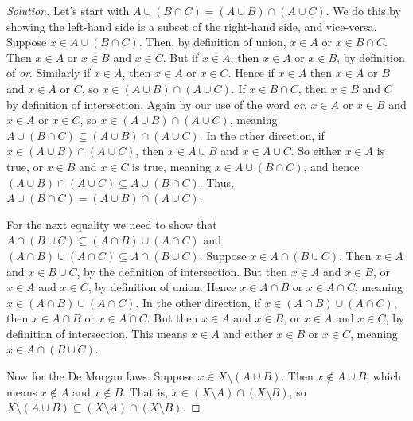 \documentclass{article}
\theoremstyle{normal}
\begin{document}
    \begin{proof}[Solution]
        Let's start with $A\cup(B\cap{C})=(A\cup{B})\cap(A\cup{C})$. We do this
        by showing the left-hand side is a subset of the right-hand side, and
        vice-versa. Suppose $x\in{A}\cup(B\cap{C})$. Then, by definition of
        union, $x\in{A}$ or $x\in{B}\cap{C}$. Then $x\in{A}$ or $x\in{B}$ and
        $x\in{C}$. But if $x\in{A}$, then $x\in{A}$ or $x\in{B}$, by definition
        of \textit{or}. Similarly if $x\in{A}$, then $x\in{A}$ or $x\in{C}$.
        Hence if $x\in{A}$ then $x\in{A}$ or $B$ and $x\in{A}$ or $C$, so
        $x\in(A\cup{B})\cap(A\cup{C})$. If $x\in{B}\cap{C}$, then $x\in{B}$ and
        $C$ by definition of intersection. Again by our use of the word
        \textit{or}, $x\in{A}$ or $x\in{B}$ and $x\in{A}$ or $x\in{C}$, so
        $x\in(A\cup{B})\cap(A\cup{C})$, meaning
        $A\cup(B\cap{C})\subseteq(A\cup{B})\cap(A\cup{C})$. In the other
        direction, if $x\in(A\cup{B})\cap(A\cup{C})$, then
        $x\in{A}\cup{B}$ and $x\in{A}\cup{C}$. So either $x\in{A}$ is true,
        or $x\in{B}$ and $x\in{C}$ is true, meaning
        $x\in{A}\cup(B\cap{C})$, and hence
        $(A\cup{B})\cap(A\cup{C})\subseteq{A}\cup(B\cap{C})$. Thus,
        $A\cup(B\cap{C})=(A\cup{B})\cap(A\cup{C})$.
        \par\hfill\par
        For the next equality we need to show that
        $A\cap(B\cup{C})\subseteq(A\cap{B})\cup(A\cap{C})$ and
        $(A\cap{B})\cup(A\cap{C})\subseteq{A}\cap(B\cup{C})$.
        Suppose $x\in{A}\cap(B\cup{C})$. Then $x\in{A}$ and
        $x\in{B}\cup{C}$, by the definition of intersection. But then
        $x\in{A}$ and $x\in{B}$, or $x\in{A}$ and $x\in{C}$, by definition of
        union. Hence $x\in{A}\cap{B}$ or $x\in{A}\cap{C}$, meaning
        $x\in(A\cap{B})\cup(A\cap{C})$. In the other direction, if
        $x\in(A\cap{B})\cup(A\cap{C})$, then $x\in{A}\cap{B}$ or
        $x\in{A}\cap{C}$. But then $x\in{A}$ and $x\in{B}$, or
        $x\in{A}$ and $x\in{C}$, by definition of intersection. This means
        $x\in{A}$ and either $x\in{B}$ or $x\in{C}$, meaning
        $x\in{A}\cap(B\cup{C})$.
        \par\hfill\par
        Now for the De Morgan laws. Suppose $x\in{X}\setminus(A\cup{B})$.
        Then $x\notin{A}\cup{B}$, which means $x\notin{A}$ and
        $x\notin{B}$. That is, $x\in(X\setminus{A})\cap(X\setminus{B})$,
        so $X\setminus(A\cup{B})\subseteq(X\setminus{A})\cap(X\setminus{B})$.

\end{proof}
\end{document}
